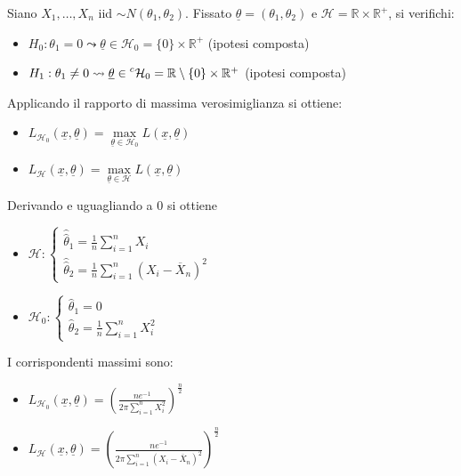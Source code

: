 \documentclass[hidelinks, 10pt]{report}
\begin{document}
\begin{es}
Siano $ X_{1}, \dotsc, X_{n} $ iid $ \sim N(\theta_{1}, \theta_{2}) $. Fissato $ \underline{\theta} = (\theta_{1}, \theta_{2}) $ e $ \mathcal{H} = \mathbb{R} \times \mathbb{R}^{+} $, si verifichi:
\begin{itemize}
\item $ H_{0}: \theta_{1} = 0 \leadsto \underline{\theta} \in \mathcal{H}_{0} = \{ 0 \} \times \mathbb{R}^{+} $ (ipotesi composta)
\item $ H_{1}: \theta_{1} \ne 0 \leadsto \underline{\theta} \in \prescript{c}{}{\mathcal{H}_{0}} = \mathbb{R} \setminus \{ 0 \} \times \mathbb{R}^{+} $ (ipotesi composta)
\end{itemize}

Applicando il rapporto di massima verosimiglianza si ottiene:
\begin{itemize}
\item $ L_{\mathcal{H}_{0}} (\underline{x}, \underline{\theta}) = \max\limits_{\underline{\theta} \in \mathcal{H}_{0}} L(\underline{x}, \underline{\theta}) $
\item $ L_{\mathcal{H}} (\underline{x}, \underline{\theta}) = \max\limits_{\underline{\theta} \in \mathcal{H}} L(\underline{x}, \underline{\theta}) $
\end{itemize}

Derivando e uguagliando a $ 0 $ si ottiene
\begin{itemize}
\item $ \mathcal{H} : \begin{cases} \hat{\hat{\theta}}_{1} = \frac{1}{n} \sum\limits_{i = 1}^{n} X_{i} \\ \hat{\hat{\theta}}_{2} = \frac{1}{n} \sum\limits_{i = 1}^{n} (X_{i} - \overline{X}_{n})^{2} \end{cases} $
\item $ \mathcal{H}_{0} : \begin{cases} \hat{\theta}_{1} = 0 \\ \hat{\theta}_{2} = \frac{1}{n} \sum\limits_{i = 1}^{n} X_{i}^{2} \end{cases} $
\end{itemize}

I corrispondenti massimi sono:
\begin{itemize}
\item $ L_{\mathcal{H}_{0}} (\underline{x}, \underline{\theta}) = \left( \frac{n e^{-1}}{2 \pi \sum\limits_{i = 1}^{n} X_{i}^{2}} \right)^{\frac{n}{2}} $
\item $ L_{\mathcal{H}} (\underline{x}, \underline{\theta}) = \left( \frac{n e^{-1}}{2 \pi \sum\limits_{i = 1}^{n} (X_{i} - \overline{X}_{n})^{2}} \right)^{\frac{n}{2}} $
\end{itemize}


\end{es}
\end{document}

